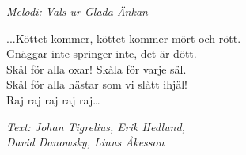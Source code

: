 {\footnotesize\textit{Melodi: Vals ur Glada Änkan}}\par
\vspace{10pt}
...Köttet kommer, köttet kommer mört och rött.\\
Gnäggar inte springer inte, det är dött.\\
Skål för alla oxar! Skåla för varje säl.\\
Skål för alla hästar som vi slått ihjäl!\\
Raj raj raj raj raj…\par
\vspace{10pt}
{\footnotesize\textit{Text: Johan Tigrelius, Erik Hedlund,\\ David Danowsky, Linus Åkesson}}
